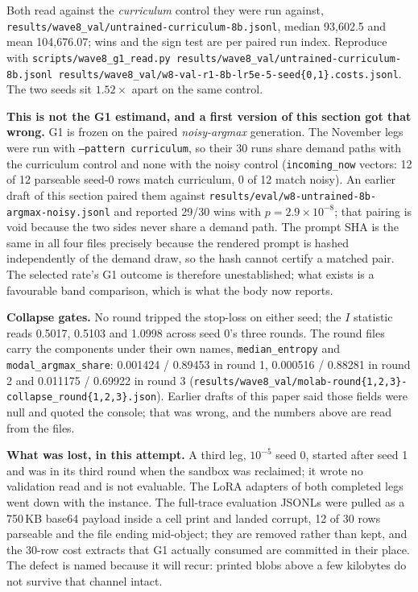 \documentclass[11pt,a4paper]{article}
\begin{document}
Both read against the \emph{curriculum} control they were run against,
\texttt{results/wave8\_val/untrained-curriculum-8b.jsonl}, median 93{,}602.5 and mean 104{,}676.07;
wins and the sign test are per paired run index. Reproduce with
\texttt{scripts/wave8\_g1\_read.py results/wave8\_val/untrained-curriculum-8b.jsonl
results/wave8\_val/w8-val-r1-8b-lr5e-5-seed\{0,1\}.costs.jsonl}. The two seeds sit
$1.52\times$ apart on the same control.

\textbf{This is not the G1 estimand, and a first version of this section got that wrong.} G1 is
frozen on the paired \emph{noisy-argmax} generation. The November legs were run with
\texttt{--pattern curriculum}, so their 30 runs share demand paths with the curriculum control and
none with the noisy control (\texttt{incoming\_now} vectors: 12 of 12 parseable seed-0 rows match
curriculum, 0 of 12 match noisy). An earlier draft of this section paired them against
\texttt{results/eval/w8-untrained-8b-argmax-noisy.jsonl} and reported 29/30 wins with
$p=2.9\times10^{-8}$; that pairing is void because the two sides never share a demand path. The
prompt SHA is the same in all four files precisely because the rendered prompt is hashed
independently of the demand draw, so the hash cannot certify a matched pair. The selected rate's G1
outcome is therefore unestablished; what exists is a favourable band comparison, which is what the
body now reports.

\textbf{Collapse gates.} No round tripped the stop-loss on either seed; the $I$ statistic reads
0.5017, 0.5103 and 1.0998 across seed 0's three rounds. The round files carry the components under
their own names, \texttt{median\_entropy} and \texttt{modal\_argmax\_share}: 0.001424 / 0.89453 in
round 1, 0.000516 / 0.88281 in round 2 and 0.011175 / 0.69922 in round 3
(\texttt{results/wave8\_val/molab-round\{1,2,3\}-collapse\_round\{1,2,3\}.json}). Earlier drafts of
this paper said those fields were null and quoted the console; that was wrong, and the numbers above
are read from the files.

\textbf{What was lost, in this attempt.} A third leg, $10^{-5}$ seed 0, started after seed 1 and
was in its third round when the sandbox was reclaimed; it wrote no validation read and is not
evaluable. The LoRA adapters of both completed legs went down with the instance. The full-trace
evaluation JSONLs were pulled as a 750\,KB base64 payload inside a cell print and landed corrupt,
12 of 30 rows parseable and the file ending mid-object; they are removed rather than kept, and the
30-row cost extracts that G1 actually consumed are committed in their place. The defect is named
because it will recur: printed blobs above a few kilobytes do not survive that channel intact.
\end{document}
